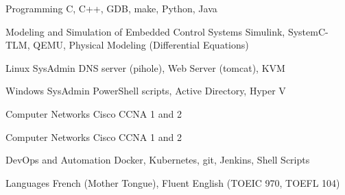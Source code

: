 

\begin{cvskills}
{

    \cvskill
    {Programming} %
    {C, C++, GDB, make, Python, Java} %

    \cvskill
    {Modeling and Simulation of Embedded Control Systems} %
    {Simulink, SystemC-TLM, QEMU, Physical Modeling (Differential Equations)} %

	}{}
{

    \cvskill
    {Linux SysAdmin} %
    {DNS server (pihole), Web Server (tomcat), KVM} %

    \cvskill
    {Windows SysAdmin} %
    {PowerShell scripts, Active Directory, Hyper V} %

    \cvskill
    {Computer Networks} %
    {Cisco CCNA 1 and 2} %

}{}
    \cvskill
    {Computer Networks} %
    {Cisco CCNA 1 and 2} %

    \cvskill
    {DevOps and Automation} %
    {Docker, Kubernetes, git, Jenkins, Shell Scripts} %

	\cvskill
	{Languages} %
    {French (Mother Tongue), Fluent English (TOEIC 970, TOEFL 104)} %

\end{cvskills}
